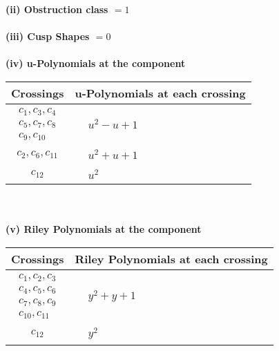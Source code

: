 \documentclass[1p]{elsarticle_modified}
\theoremstyle{definition}
\begin{document}
\flushleft \textbf{(ii) Obstruction class $= 1$}\\~\\
\flushleft \textbf{(iii) Cusp Shapes $= 0$}\\~\\
\newpage\renewcommand{\arraystretch}{1}
\flushleft \textbf{(iv) u-Polynomials at the component}\newline \\
\begin{tabular}{m{50pt}|m{274pt}}
Crossings & \hspace{64pt}u-Polynomials at each crossing \\
\hline $$\begin{aligned}c_{1},c_{3},c_{4}\\c_{5},c_{7},c_{8}\\c_{9},c_{10}\end{aligned}$$&$\begin{aligned}
&u^2- u+1
\end{aligned}$\\
\hline $$\begin{aligned}c_{2},c_{6},c_{11}\end{aligned}$$&$\begin{aligned}
&u^2+u+1
\end{aligned}$\\
\hline $$\begin{aligned}c_{12}\end{aligned}$$&$\begin{aligned}
&u^2
\end{aligned}$\\
\hline
\end{tabular}\\~\\
\newpage\renewcommand{\arraystretch}{1}
\flushleft \textbf{(v) Riley Polynomials at the component}\newline \\
\begin{tabular}{m{50pt}|m{274pt}}
Crossings & \hspace{64pt}Riley Polynomials at each crossing \\
\hline $$\begin{aligned}c_{1},c_{2},c_{3}\\c_{4},c_{5},c_{6}\\c_{7},c_{8},c_{9}\\c_{10},c_{11}\end{aligned}$$&$\begin{aligned}
&y^2+y+1
\end{aligned}$\\
\hline $$\begin{aligned}c_{12}\end{aligned}$$&$\begin{aligned}
&y^2
\end{aligned}$\\
\hline
\end{tabular}\\~\\
\end{document}
